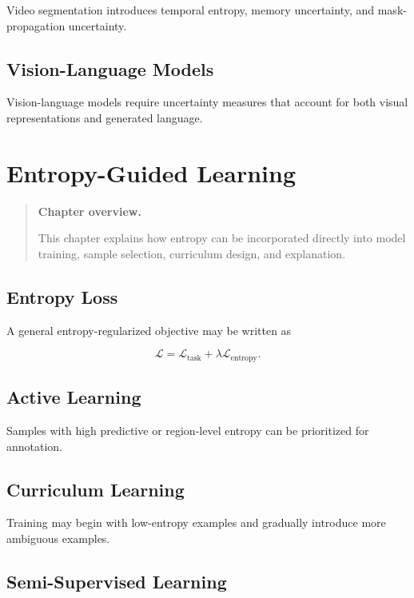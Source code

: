 \documentclass[11pt,oneside]{book}
\theoremstyle{remark}
\newenvironment{chapteroverview}
{
	\begin{quote}
		\small
		\textbf{Chapter overview.}
	}
	{
	\end{quote}
}
\begin{document}
	Video segmentation introduces temporal entropy, memory uncertainty, and
	mask-propagation uncertainty.
	
	\section{Vision-Language Models}
	
	Vision-language models require uncertainty measures that account for both
	visual representations and generated language.
	
	
	\chapter{Entropy-Guided Learning}
	\label{chap:entropy-guided-learning}
	
	\begin{chapteroverview}
		This chapter explains how entropy can be incorporated directly into model
		training, sample selection, curriculum design, and explanation.
	\end{chapteroverview}
	
	\section{Entropy Loss}
	
	A general entropy-regularized objective may be written as
	
	\[
	\mathcal{L}
	=
	\mathcal{L}_{\mathrm{task}}
	+
	\lambda\mathcal{L}_{\mathrm{entropy}}.
	\]
	
	\section{Active Learning}
	
	Samples with high predictive or region-level entropy can be prioritized for
	annotation.
	
	\section{Curriculum Learning}
	
	Training may begin with low-entropy examples and gradually introduce more
	ambiguous examples.
	
	\section{Semi-Supervised Learning}
	
\end{document}
